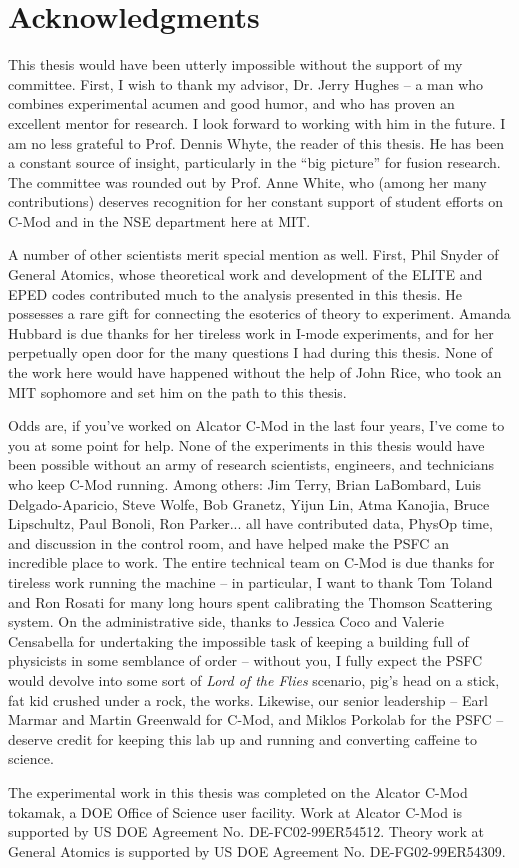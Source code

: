 
\chapter*{Acknowledgments}


This thesis would have been utterly impossible without the support of my committee.  First, I wish to thank my advisor, Dr. Jerry Hughes -- a man who combines experimental acumen and good humor, and who has proven an excellent mentor for research.  I look forward to working with him in the future.  I am no less grateful to Prof. Dennis Whyte, the reader of this thesis.  He has been a constant source of insight, particularly in the ``big picture'' for fusion research.  The committee was rounded out by Prof. Anne White, who (among her many contributions) deserves recognition for her constant support of student efforts on C-Mod and in the NSE department here at MIT.

A number of other scientists merit special mention as well.  First, Phil Snyder of General Atomics, whose theoretical work and development of the ELITE and EPED codes contributed much to the analysis presented in this thesis.  He possesses a rare gift for connecting the esoterics of theory to experiment.  Amanda Hubbard is due thanks for her tireless work in I-mode experiments, and for her perpetually open door for the many questions I had during this thesis.  None of the work here would have happened without the help of John Rice, who took an MIT sophomore and set him on the path to this thesis.

Odds are, if you've worked on Alcator C-Mod in the last four years, I've come to you at some point for help.  None of the experiments in this thesis would have been possible without an army of research scientists, engineers, and technicians who keep C-Mod running.  Among others: Jim Terry, Brian LaBombard, Luis Delgado-Aparicio, Steve Wolfe, Bob Granetz, Yijun Lin, Atma Kanojia, Bruce Lipschultz, Paul Bonoli, Ron Parker... all have contributed data, PhysOp time, and discussion in the control room, and have helped make the PSFC an incredible place to work.  The entire technical team on C-Mod is due thanks for tireless work running the machine -- in particular, I want to thank Tom Toland and Ron Rosati for many long hours spent calibrating the Thomson Scattering system.  On the administrative side, thanks to Jessica Coco and Valerie Censabella for undertaking the impossible task of keeping a building full of physicists in some semblance of order -- without you, I fully expect the PSFC would devolve into some sort of \emph{Lord of the Flies} scenario, pig's head on a stick, fat kid crushed under a rock, the works.  Likewise, our senior leadership -- Earl Marmar and Martin Greenwald for C-Mod, and Miklos Porkolab for the PSFC -- deserve credit for keeping this lab up and running and converting caffeine to science.



The experimental work in this thesis was completed on the Alcator C-Mod tokamak, a DOE Office of Science user facility.  Work at Alcator C-Mod is supported by US DOE Agreement No. DE-FC02-99ER54512.  Theory work at General Atomics is supported by US DOE Agreement No. DE-FG02-99ER54309.